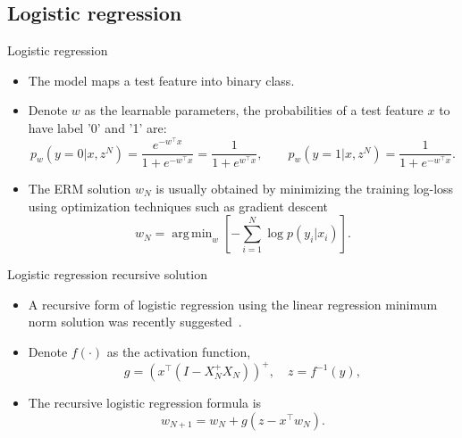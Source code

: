 \documentclass[aspectratio=169]{beamer}
\DeclareMathOperator*{\argmin}{arg\,min}
\begin{document}
\subsection{Logistic regression}
\begin{frame}{Logistic regression}
\begin{itemize}
\item The model maps a test feature into binary class.
\item Denote $w$ as the learnable parameters, the probabilities of a test feature $x$ to have label '0' and '1' are:
\begin{equation}
    p_w(y=0|x,z^N) = \frac{e^{-w^\top x}}{1 + e^{-w^\top x}} = \frac{1}{1 + e^{w^\top x}}, \qquad
    p_w(y=1|x, z^N) = \frac{1}{1 + e^{-w^\top x}}.
\end{equation}
\item The ERM solution $w_N$ is usually obtained by minimizing the training log-loss using optimization techniques such as gradient descent
\begin{equation}
w_N = \argmin_{w} \left[ - \sum_{i=1}^N \log p(y_i|x_i) \right].
\end{equation}
\end{itemize}
\end{frame}

\begin{frame}{Logistic regression recursive solution}
\begin{itemize}
\item A recursive form of logistic regression using the linear regression minimum norm solution was recently suggested~.
\item Denote $f(\cdot)$ as the activation function, 
\begin{equation}
    g = \left(x^\top \left(I - X^+_N X_N \right) \right)^+, \quad  z = f^{-1}(y),
\end{equation}
\item The recursive logistic regression formula is
\begin{equation} \label{eq:logistig_regression_recurisve}
    w_{N+1} = w_N + g \left(z - x^\top w_N \right).
\end{equation}
\end{itemize}
\end{frame}
\end{document}
